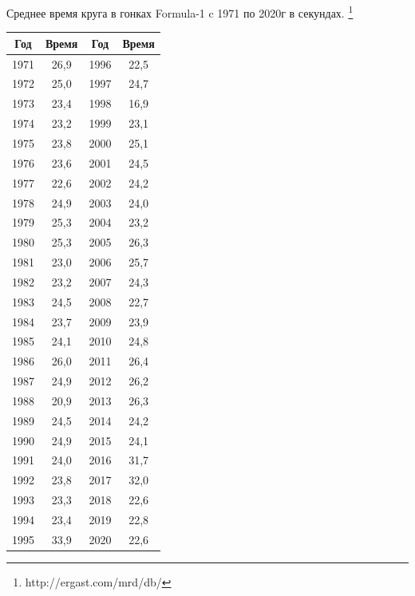 \documentclass[utf8, a4paper, 14pt, russian, oneside]{book}
\begin{document}


\tableofcontents
\newpage

Среднее время круга в гонках Formula-1 c 1971 по 2020г в секундах. \footnote{http://ergast.com/mrd/db/}
\begin{table}[h!]
    \centering
    \begin{tabular}{|c|c|c|c|}
        \hline
        Год & Время & Год & Время \\ \hline
        1971 & 26,9 & 1996 & 22,5 \\ \hline
        1972 & 25,0 & 1997 & 24,7 \\ \hline
        1973 & 23,4 & 1998 & 16,9 \\ \hline
        1974 & 23,2 & 1999 & 23,1 \\ \hline
        1975 & 23,8 & 2000 & 25,1 \\ \hline
        1976 & 23,6 & 2001 & 24,5 \\ \hline
        1977 & 22,6 & 2002 & 24,2 \\ \hline
        1978 & 24,9 & 2003 & 24,0 \\ \hline
        1979 & 25,3 & 2004 & 23,2 \\ \hline
        1980 & 25,3 & 2005 & 26,3 \\ \hline
        1981 & 23,0 & 2006 & 25,7 \\ \hline
        1982 & 23,2 & 2007 & 24,3 \\ \hline
        1983 & 24,5 & 2008 & 22,7 \\ \hline
        1984 & 23,7 & 2009 & 23,9 \\ \hline
        1985 & 24,1 & 2010 & 24,8 \\ \hline
        1986 & 26,0 & 2011 & 26,4 \\ \hline
        1987 & 24,9 & 2012 & 26,2 \\ \hline
        1988 & 20,9 & 2013 & 26,3 \\ \hline
        1989 & 24,5 & 2014 & 24,2 \\ \hline
        1990 & 24,9 & 2015 & 24,1 \\ \hline
        1991 & 24,0 & 2016 & 31,7 \\ \hline
        1992 & 23,8 & 2017 & 32,0 \\ \hline
        1993 & 23,3 & 2018 & 22,6 \\ \hline
        1994 & 23,4 & 2019 & 22,8 \\ \hline
        1995 & 33,9 & 2020 & 22,6 \\ \hline
    \end{tabular}
\end{table}
\newpage
\end{document}
